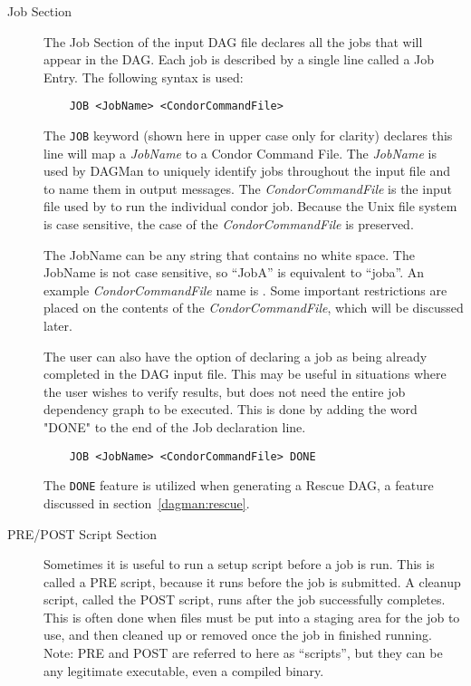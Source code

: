 \begin{description}

\item[Job Section]

The Job Section of the input DAG file declares all the jobs that will appear
in the DAG.  Each job is described by a single line called a Job Entry.  The
following syntax is used:

\begin{verbatim}
	JOB <JobName> <CondorCommandFile>
\end{verbatim}

The \texttt{JOB} keyword (shown here in upper case only for clarity) declares
this line will map a \textit{JobName} to a Condor Command File.  The
\textit{JobName} is used by DAGMan to uniquely identify jobs throughout the
input file and to name them in output messages.  The
\textit{CondorCommandFile} is the input file used by  to run
the individual condor job.  Because the Unix file system is case sensitive,
the case of the \textit{CondorCommandFile} is preserved.

The JobName can be any string that contains no white space.  The JobName is
not case sensitive, so ``JobA'' is equivalent to ``joba''.  An example
\textit{CondorCommandFile} name is .  Some important
restrictions are placed on the contents of the \textit{CondorCommandFile},
which will be discussed later.

The user can also have the option of declaring a job as being already
completed in the DAG input file. This may be useful in situations where the
user wishes to verify results, but does not need the entire job dependency
graph to be executed. This is done by adding the word "DONE" to the end of the
Job declaration line.

\begin{verbatim}
	JOB <JobName> <CondorCommandFile> DONE
\end{verbatim}

The \texttt{DONE} feature is utilized when generating a Rescue DAG, a feature
discussed in section~\ref{dagman:rescue}.

\item[PRE/POST Script Section]

Sometimes it is useful to run a setup script before a job is run.  This is
called a PRE script, because it runs before the job is submitted.  A cleanup
script, called the POST script, runs after the job successfully completes.
This is often done when files must be put into a staging area for the job to
use, and then cleaned up or removed once the job in finished running.  Note:
PRE and POST are referred to here as ``scripts'', but they can be any
legitimate executable, even a compiled binary.


\end{description}
